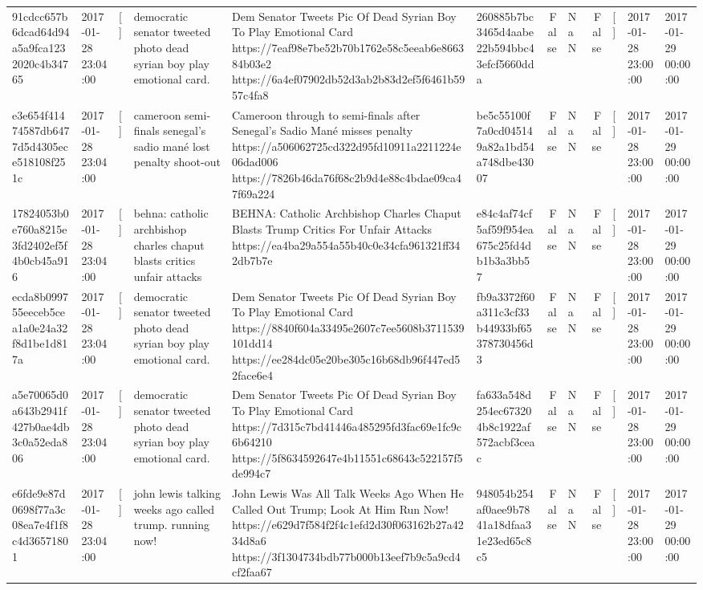 \begin{tabular}{llllllrlrlll}
91cdcc657b6dcad64d94a5a9fca1232020c4b34765 & 2017-01-28 23:04:00 & [] & democratic senator tweeted photo dead syrian boy play emotional card. & Dem Senator Tweets Pic Of Dead Syrian Boy To Play Emotional Card https://7eaf98e7be52b70b1762e58c5eeab6e866384b03e2 https://6a4ef07902db52d3ab2b83d2ef5f6461b5957c4fa8 & 260885b7bc3465d4aabe22b594bbc43efcf5660dda & False & NaN & False & [] & 2017-01-28 23:00:00 & 2017-01-29 00:00:00 \\
e3e654f41474587db6477d5d4305ece518108f251c & 2017-01-28 23:04:00 & [] & cameroon semi-finals senegal's sadio mané lost penalty shoot-out & Cameroon through to semi-finals after Senegal’s Sadio Mané misses penalty https://a506062725cd322d95fd10911a2211224e06dad006 https://7826b46da76f68c2b9d4e88c4bdae09ca47f69a224 & be5c55100f7a0cd045149a82a1bd54a748dbe43007 & False & NaN & False & [] & 2017-01-28 23:00:00 & 2017-01-29 00:00:00 \\
17824053b0e760a8215e3fd2402ef5f4b0cb45a916 & 2017-01-28 23:04:00 & [] & behna: catholic archbishop charles chaput blasts critics unfair attacks & BEHNA: Catholic Archbishop Charles Chaput Blasts Trump Critics For Unfair Attacks https://ea4ba29a554a55b40c0e34cfa961321ff342db7b7e & e84c4af74cf5af59f954ea675c25fd4db1b3a3bb57 & False & NaN & False & [] & 2017-01-28 23:00:00 & 2017-01-29 00:00:00 \\
ecda8b099755eeceb5cea1a0e24a32f8d1be1d817a & 2017-01-28 23:04:00 & [] & democratic senator tweeted photo dead syrian boy play emotional card. & Dem Senator Tweets Pic Of Dead Syrian Boy To Play Emotional Card https://8840f604a33495e2607c7ee5608b3711539101dd14 https://ee284dc05e20be305c16b68db96f447ed52face6e4 & fb9a3372f60a311c3cf33b44933bf65378730456d3 & False & NaN & False & [] & 2017-01-28 23:00:00 & 2017-01-29 00:00:00 \\
a5e70065d0a643b2941f427b0ae4db3c0a52eda806 & 2017-01-28 23:04:00 & [] & democratic senator tweeted photo dead syrian boy play emotional card. & Dem Senator Tweets Pic Of Dead Syrian Boy To Play Emotional Card https://7d315c7bd41446a485295fd3fac69e1fc9c6b64210 https://5f8634592647e4b11551c68643c522157f5de994c7 & fa633a548d254ec673204b8c1922af572acbf3ceac & False & NaN & False & [] & 2017-01-28 23:00:00 & 2017-01-29 00:00:00 \\
e6fde9e87d0698f77a3c08ea7e4f1f8c4d36571801 & 2017-01-28 23:04:00 & [] & john lewis talking weeks ago called trump. running now! & John Lewis Was All Talk Weeks Ago When He Called Out Trump; Look At Him Run Now! https://e629d7f584f2f4c1efd2d30f063162b27a4234d8a6 https://3f1304734bdb77b000b13eef7b9c5a9cd4cf2faa67 & 948054b254af0aee9b7841a18dfaa31e23ed65c8c5 & False & NaN & False & [] & 2017-01-28 23:00:00 & 2017-01-29 00:00:00 \\

\end{tabular}
